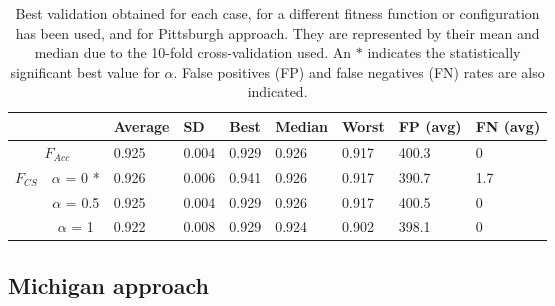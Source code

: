 \documentclass[a4paper,10pt,twocolumn,preprint,3p]{elsarticle}
\begin{document}
\begin{table*}
\begin{center}
\begin{tabular}{cc|l|l|l|l|l|l|l|}
\cline{3-9}
                                                &                & Average & SD & Best       & Median & Worst & FP (avg) & FN (avg)   \\ \hline
\multicolumn{2}{|c|}{$F_{Acc}$}                                  & 0.925 & 0.004 & 0.929      & 0.926  & 0.917 & 400.3 & 0 \\ \hline
\multicolumn{1}{|c|}{\multirow{3}{*}{$F_{CS}$}} & $\alpha$ = 0 *  & 0.926 & 0.006 & 0.941     & 0.926   & 0.917 & 390.7 & 1.7 \\ \cline{2-9} 
\multicolumn{1}{|c|}{}                          & $\alpha$ = 0.5 & 0.925 & 0.004 & 0.929       & 0.926   & 0.917 & 400.5 & 0 \\ \cline{2-9} 
\multicolumn{1}{|c|}{}                          & $\alpha$ = 1   & 0.922  & 0.008 & 0.929       & 0.924 & 0.902 & 398.1 & 0 \\ \hline
\end{tabular}
\caption{Best validation obtained for each case, for a different fitness function or configuration has been used, and for Pittsburgh approach. They are represented by their mean and median due to the 10-fold cross-validation used. An $*$ indicates the  statistically significant best value for $\alpha$. False positives (FP) and false negatives (FN) rates are also indicated.}
\label{tab:pittsburghVAL}
\end{center}
\end{table*}

\subsection{Michigan approach}
\end{document}

